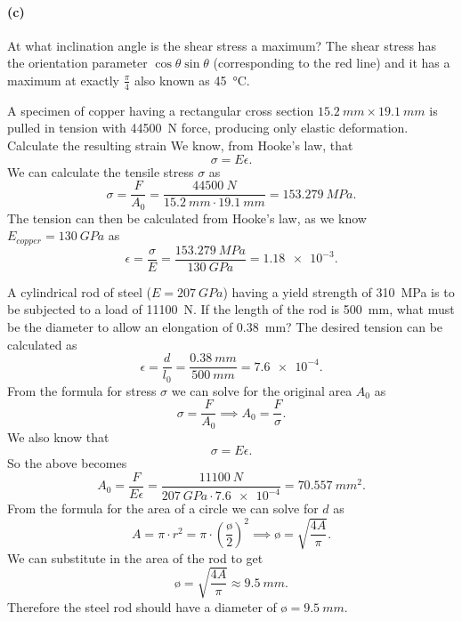 \paragraph{(c)} At what inclination angle is the shear stress a maximum?
\bigbreak
The shear stress has the orientation parameter $\cos\theta \sin\theta$ (corresponding to the red line) and it has a maximum at exactly $\frac{\pi}{4}$ also known as \qty{45}{\celsius}.


 A specimen of copper having a rectangular cross section $\qty{15,2}{mm} \times \qty{19,1}{mm}$ is pulled in tension with \qty{44500}{N} force, producing only elastic deformation. Calculate the resulting strain
\bigbreak
We know, from Hooke's law, that
\[ 
\sigma = E \epsilon
.\]
We can calculate the tensile stress $\sigma$ as
\[ 
\sigma = \frac{F}{A_0} = \frac{\qty{44500}{N}}{\qty{15,2}{mm} \cdot \qty{19,1}{mm}} = \qty{153,279}{MPa} 
.\]
The tension can then be calculated from Hooke's law, as we know $E_{copper} = \qty{130}{GPa}$ as
\[ 
\epsilon = \frac{\sigma}{E} = \frac{\qty{153,279}{MPa}}{\qty{130}{GPa}} = \num{1,18e-3} 
.\]



 A cylindrical rod of steel ($E = \qty{207}{GPa}$) having a yield strength of \qty{310}{MPa} is to be subjected to a load of \qty{11100}{N}. If the length of the rod is \qty{500}{mm}, what must be the diameter to allow an elongation of \qty{0,38}{mm}?
\bigbreak
The desired tension can be calculated as
\[ 
\epsilon = \frac{d}{l_0} = \frac{\qty{0,38}{mm}}{\qty{500}{mm}} = \num{7,6e-4}  
.\]
From the formula for stress $\sigma$ we can solve for the original area $A_0$ as
\[ 
\sigma = \frac{F}{A_0} \implies A_0 = \frac{F}{\sigma}
.\]
We also know that
\[ 
\sigma = E \epsilon
.\]
So the above becomes
\[ 
A_0 = \frac{F}{E\epsilon} = \frac{\qty{11100}{N}}{\qty{207}{GPa} \cdot \num{7,6e-4}} = \qty{70,557}{mm^2} 
.\]
From the formula for the area of a circle we can solve for $d$ as
\[ 
A = \pi \cdot r^2 = \pi \cdot \left( \frac{ø}{2} \right)^{2} \implies ø = \sqrt{\frac{4A}{\pi}}
.\]
We can substitute in the area of the rod to get
\[ 
ø = \sqrt{\frac{4A}{\pi}} \approx \qty{9,5}{mm} 
.\]
Therefore the steel rod should have a diameter of $ø = \qty{9,5}{mm}$.
